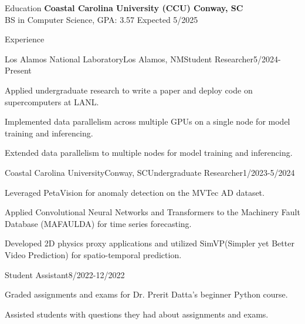 \documentclass{resume} %
\begin{document}

\begin{rSection}{Education}
  \itemsep -1pt {} 
{\bf Coastal Carolina University (CCU) \hfill Conway, SC} \\
BS in Computer Science, GPA: 3.57 \hfill Expected 5/2025 %
\end{rSection}

\begin{rSection}{Experience}
  \itemsep -1pt {} 
\begin{rSubsection}{Los Alamos National Laboratory}{Los Alamos, NM}{Student Researcher}{5/2024-Present}
  \item Applied undergraduate research to write a paper and deploy code on supercomputers at LANL.
  \item Implemented data parallelism across multiple GPUs on a single node for model training and inferencing.
  \item Extended data parallelism to multiple nodes for model training and inferencing.
\end{rSubsection}

\begin{rSubsection}{Coastal Carolina University}{Conway, SC}{Undergraduate Researcher}{1/2023-5/2024}
  \item Leveraged PetaVision for anomaly detection on the MVTec AD dataset.
  \item Applied Convolutional Neural Networks and Transformers to the Machinery Fault Database (MAFAULDA) for time series forecasting.
  \item Developed 2D physics proxy applications and utilized SimVP(Simpler yet Better Video Prediction) for spatio-temporal prediction.
\end{rSubsection}

\begin{rSubsection}{}{}{Student Assistant}{8/2022-12/2022}
  \item Graded assignments and exams for Dr. Prerit Datta's beginner Python course.
  \item Assisted students with questions they had about assignments and exams.
\end{rSubsection}


\end{rSection}
\end{document}
